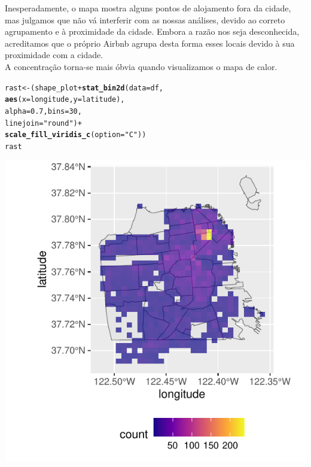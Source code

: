 \documentclass[a4paper, justified]{tufte-handout}\usepackage[]{graphicx}\usepackage[]{xcolor}
\makeatletter
\def\maxwidth{ %
  \ifdim\Gin@nat@width>\linewidth
    \linewidth
  \else
    \Gin@nat@width
  \fi
}
\newcommand{\hlnum}[1]{\textcolor[rgb]{0.686,0.059,0.569}{#1}}%
\newcommand{\hlstr}[1]{\textcolor[rgb]{0.192,0.494,0.8}{#1}}%
\newcommand{\hlopt}[1]{\textcolor[rgb]{0,0,0}{#1}}%
\newcommand{\hlstd}[1]{\textcolor[rgb]{0.345,0.345,0.345}{#1}}%
\newcommand{\hlkwb}[1]{\textcolor[rgb]{0.69,0.353,0.396}{#1}}%
\newcommand{\hlkwc}[1]{\textcolor[rgb]{0.333,0.667,0.333}{#1}}%
\newcommand{\hlkwd}[1]{\textcolor[rgb]{0.737,0.353,0.396}{\textbf{#1}}}%
\newenvironment{kframe}{%
 \def\at@end@of@kframe{}%
 \ifinner\ifhmode%
  \def\at@end@of@kframe{\end{minipage}}%
  \begin{minipage}{\columnwidth}%
 \fi\fi%
 \def\FrameCommand##1{\hskip\@totalleftmargin \hskip-\fboxsep
 \colorbox{shadecolor}{##1}\hskip-\fboxsep
     \hskip-\linewidth \hskip-\@totalleftmargin \hskip\columnwidth}%
 \MakeFramed {\advance\hsize-\width
   \@totalleftmargin\z@ \linewidth\hsize
   \@setminipage}}%
 {\par\unskip\endMakeFramed%
 \at@end@of@kframe}
\newenvironment{knitrout}{}{} %
\makeatother
\begin{document}
Inesperadamente, o mapa mostra alguns pontos de alojamento fora da cidade, mas julgamos que não vá interferir com as nossas análises, devido ao correto agrupamento e à proximidade da cidade. Embora a razão nos seja desconhecida, acreditamos que o próprio Airbnb agrupa desta forma esses locais devido à sua proximidade com a cidade. \\
A concentração torna-se mais óbvia quando visualizamos o mapa de calor.
\begin{knitrout}
\color{fgcolor}\begin{kframe}
\begin{alltt}
\hlstd{rast} \hlkwb{<-} \hlstd{(shape_plot} \hlopt{+} \hlkwd{stat_bin2d}\hlstd{(}\hlkwc{data} \hlstd{= df,}
    \hlkwd{aes}\hlstd{(}\hlkwc{x} \hlstd{= longitude,} \hlkwc{y} \hlstd{= latitude),}
    \hlkwc{alpha} \hlstd{=} \hlnum{0.7}\hlstd{,} \hlkwc{bins} \hlstd{=} \hlnum{30}\hlstd{,}
    \hlkwc{linejoin} \hlstd{=} \hlstr{"round"}\hlstd{)} \hlopt{+}
    \hlkwd{scale_fill_viridis_c}\hlstd{(}\hlkwc{option} \hlstd{=} \hlstr{"C"}\hlstd{))}
\hlstd{rast}
\end{alltt}
\end{kframe}\begin{marginfigure}
\includegraphics[width=\maxwidth]{figure/chunk-rasterPlaces-1} \end{marginfigure}

\end{knitrout}
\end{document}
